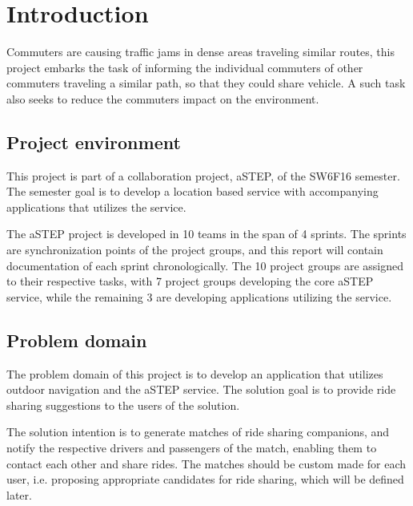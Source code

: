\chapter{Introduction}\label{ch:introduction}


Commuters are causing traffic jams in dense areas traveling similar routes, this project embarks the task of informing the individual commuters of other commuters traveling a similar path, so that they could share vehicle.
A such task also seeks to reduce the commuters impact on the environment.


\section{Project environment}
This project is part of a collaboration project, aSTEP, of the SW6F16 semester.
The semester goal is to develop a location based service with accompanying applications that utilizes the service. 

The aSTEP project is developed in 10 teams in the span of 4 sprints.
The sprints are synchronization points of the project groups, and this report will contain documentation of each sprint chronologically.
The 10 project groups are assigned to their respective tasks, with 7 project groups developing the core aSTEP service, while the remaining 3 are developing applications utilizing the service.


\section{Problem domain}
The problem domain of this project is to develop an application that utilizes outdoor navigation and the aSTEP service.
The solution goal is to provide ride sharing suggestions to the users of the solution. 

The solution intention is to generate matches of ride sharing companions, and notify the respective drivers and passengers of the match, enabling them to contact each other and share rides.
The matches should be custom made for each user, i.e. proposing appropriate candidates for ride sharing, which will be defined later.

